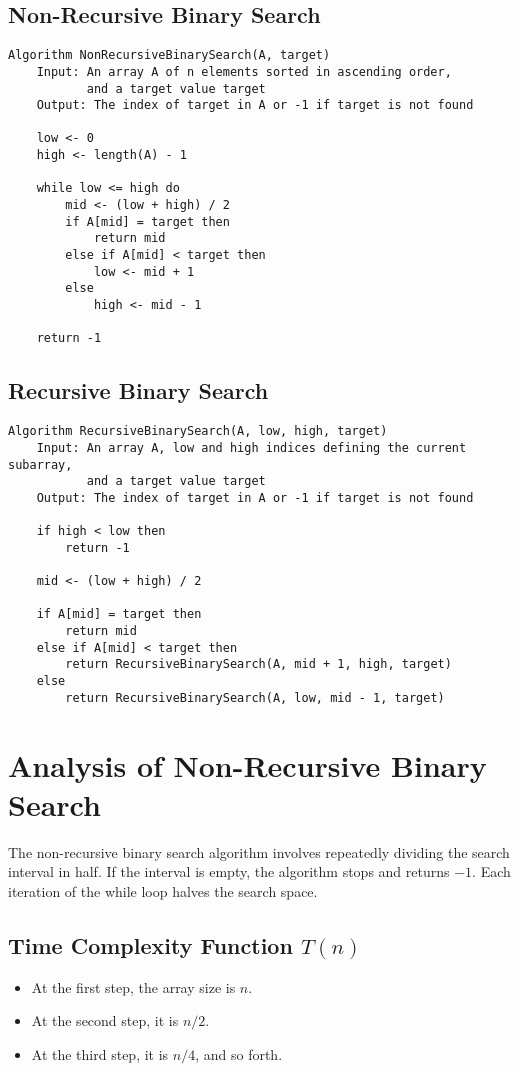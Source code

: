 \documentclass{article}
\begin{document}
\subsection{Non-Recursive Binary Search\cite{chatgpt2023}}
\begin{verbatim}
Algorithm NonRecursiveBinarySearch(A, target)
    Input: An array A of n elements sorted in ascending order, 
           and a target value target
    Output: The index of target in A or -1 if target is not found

    low <- 0
    high <- length(A) - 1

    while low <= high do
        mid <- (low + high) / 2
        if A[mid] = target then
            return mid
        else if A[mid] < target then
            low <- mid + 1
        else
            high <- mid - 1

    return -1
\end{verbatim}

\subsection{Recursive Binary Search}
\begin{verbatim}
Algorithm RecursiveBinarySearch(A, low, high, target)
    Input: An array A, low and high indices defining the current subarray, 
           and a target value target
    Output: The index of target in A or -1 if target is not found

    if high < low then
        return -1

    mid <- (low + high) / 2

    if A[mid] = target then
        return mid
    else if A[mid] < target then
        return RecursiveBinarySearch(A, mid + 1, high, target)
    else
        return RecursiveBinarySearch(A, low, mid - 1, target)
\end{verbatim}

\section{Analysis of Non-Recursive Binary Search \cite{chatgpt2023}}
The non-recursive binary search algorithm involves repeatedly dividing the search interval in half. If the interval is empty, the algorithm stops and returns \(-1\). Each iteration of the while loop halves the search space.

\subsection{Time Complexity Function \( T(n) \)}
\begin{itemize}
    \item At the first step, the array size is \( n \).
    \item At the second step, it is \( n/2 \).
    \item At the third step, it is \( n/4 \), and so forth.
\end{itemize}
\end{document}

